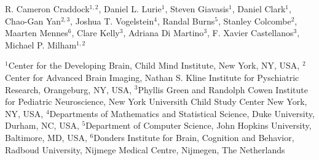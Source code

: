 R. Cameron Craddock$^{1,2}$,
Daniel L. Lurie$^1$,
Steven Giavasis$^{1}$,
Daniel Clark$^{1}$,
Chao-Gan Yan$^{2,3}$,
Joshua T. Vogelstein$^4$,
Randal Burns$^5$,
Stanley Colcombe$^2$,
Maarten Mennes$^6$,
Clare Kelly$^3$,
Adriana Di Martino$^3$,
F. Xavier Castellanos$^3$,
Michael P. Milham$^{1,2}$



$^1${Center for the Developing Brain, Child Mind Institute, New York, NY, USA},
$^2${Center for Advanced Brain Imaging, Nathan S. Kline Institute for Pyschiatric Research, Orangeburg, NY, USA},
$^3${Phyllis Green and Randolph Cowen Institute for Pediatric Neuroscience, New York Universith Child Study Center New York, NY, USA},
$^4${Departments of Mathematics and Statistical Science, Duke University, Durham, NC, USA},
$^5${Department of Computer Science, John Hopkins University, Baltimore, MD, USA},
$^6${Donders Institute for Brain, Cognition and Behavior, Radboud University, Nijmege Medical Centre, Nijmegen, The Netherlands}

